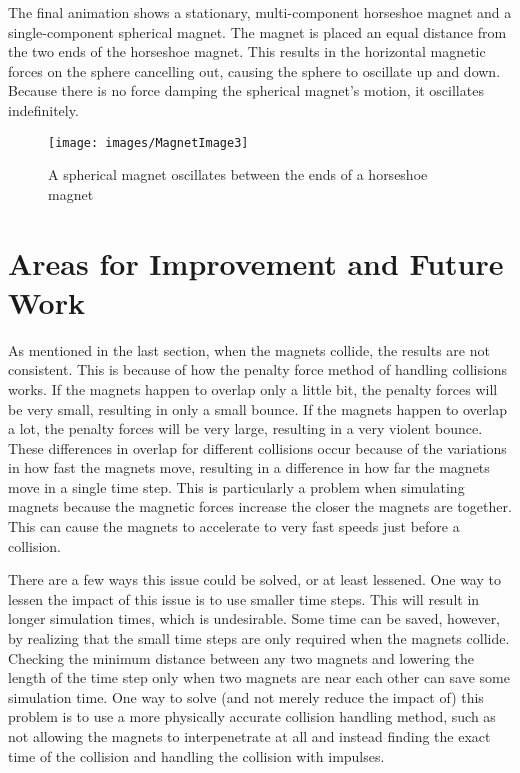\documentclass[tog]{acmsiggraph}
\begin{document}
The final animation shows a stationary, multi-component horseshoe magnet and a single-component spherical magnet. The magnet is placed an equal distance from the two ends of the horseshoe magnet. This results in the horizontal magnetic forces on the sphere cancelling out, causing the sphere to oscillate up and down. Because there is no force damping the spherical magnet's motion, it oscillates indefinitely.

\begin{figure}[ht]
  \centering
  \texttt{[image: images/MagnetImage3]}
  \caption{A spherical magnet oscillates between the ends of a horseshoe magnet}
\end{figure}

\section{Areas for Improvement and Future Work}

As mentioned in the last section, when the magnets collide, the results are not consistent. This is because of how the penalty force method of handling collisions works. If the magnets happen to overlap only a little bit, the penalty forces will be very small, resulting in only a small bounce. If the magnets happen to overlap a lot, the penalty forces will be very large, resulting in a very violent bounce. These differences in overlap for different collisions occur because of the variations in how fast the magnets move, resulting in a difference in how far the magnets move in a single time step. This is particularly a problem when simulating magnets because the magnetic forces increase the closer the magnets are together. This can cause the magnets to accelerate to very fast speeds just before a collision.

There are a few ways this issue could be solved, or at least lessened. One way to lessen the impact of this issue is to use smaller time steps. This will result in longer simulation times, which is undesirable. Some time can be saved, however, by realizing that the small time steps are only required when the magnets collide. Checking the minimum distance between any two magnets and lowering the length of the time step only when two magnets are near each other can save some simulation time. One way to solve (and not merely reduce the impact of) this problem is to use a more physically accurate collision handling method, such as not allowing the magnets to interpenetrate at all and instead finding the exact time of the collision and handling the collision with impulses.
\end{document}
